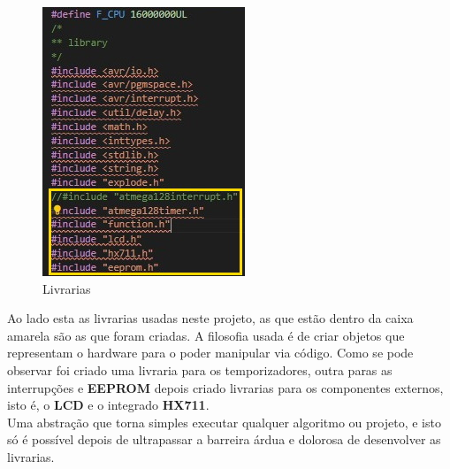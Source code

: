 \begin{minipage}{.40\linewidth}
\begin{figure}[H]
	\flushleft
	\captionsetup{justification=raggedright,singlelinecheck=false}
	\includegraphics[scale=0.9]{./image/PESTA/Code/Livrarias.jpg}
	\caption{Livrarias}
	\label{Livrarias}
\end{figure}
\end{minipage}
\begin{minipage}{.6\linewidth}
Ao lado esta as livrarias usadas neste projeto, as que estão dentro da caixa amarela são as que foram criadas.
A filosofia usada é de criar objetos que representam o hardware para o poder manipular via código. Como se pode observar foi criado uma livraria para os temporizadores, outra paras as interrupções e \textbf{EEPROM} depois criado livrarias para os componentes externos, isto é, o \textbf{LCD} e o integrado \textbf{HX711}. \\
Uma abstração que torna simples executar qualquer algoritmo ou projeto, e isto só é possível depois de ultrapassar a barreira árdua e dolorosa de desenvolver as livrarias.
\\
\\
\\
\end{minipage}
\newpage

